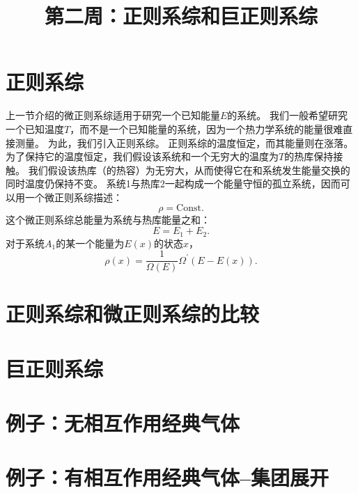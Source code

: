\documentclass[12pt,aps,pra,notitlepage]{revtex4-1}
\begin{document}
\title{第二周：正则系综和巨正则系综}
\maketitle

\section{正则系综}
\label{sec:canonical}

上一节介绍的微正则系综适用于研究一个已知能量$E$的系统。
我们一般希望研究一个已知温度$T$，而不是一个已知能量的系统，因为一个热力学系统的能量很难直接测量。
为此，我们引入正则系综。
正则系综的温度恒定，而其能量则在涨落。
为了保持它的温度恒定，我们假设该系统和一个无穷大的温度为$T$的热库保持接触。
我们假设该热库（的热容）为无穷大，从而使得它在和系统发生能量交换的同时温度仍保持不变。
系统1与热库2一起构成一个能量守恒的孤立系统，因而可以用一个微正则系综描述：
\[\rho = \text{Const}.\]
这个微正则系综总能量为系统与热库能量之和：
\[E = E_1 + E_2.\]
对于系统$A_1$的某一个能量为$E(x)$的状态$x$，
\[\rho(x) = \frac1{\Omega(E)}\Omega^\prime(E-E(x)).\]

\section{正则系综和微正则系综的比较}

\section{巨正则系综}
\label{sec:grand}

\section{例子：无相互作用经典气体}
\section{例子：有相互作用经典气体--集团展开}
\end{document}
